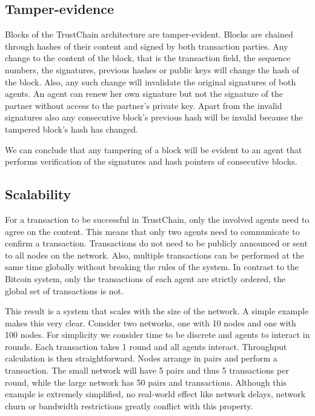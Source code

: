 \subsection{Tamper-evidence}
\label{sec:tamper-proof}
Blocks of the TrustChain architecture are tamper-evident. Blocks are chained through hashes of their
content and signed by both transaction parties. Any change to the content of the block, that is the
transaction field, the sequence numbers, the signatures, previous hashes or public keys will change
the hash of the block. Also, any such change will invalidate the original signatures of both agents. An agent
can renew her own signature but not the signature of the partner without access to the 
partner's private key. Apart from the invalid signatures also any consecutive block's previous hash
will be invalid because the tampered block's hash has changed.

We can conclude that any tampering of a block will be evident to an agent that performs verification
of the signatures and hash pointers of consecutive blocks.

\subsection{Scalability}
\label{sec:trustchain_scalability}
For a transaction to be successful in TrustChain, only the involved agents need to agree on the content. This
means that only two agents need to communicate to confirm a transaction. Transactions do not need to 
be publicly announced or sent to all nodes on
the network. Also, multiple transactions can be performed at the same time globally without breaking
the rules of the system. In contrast to the Bitcoin system, only the transactions of each agent are
strictly ordered, the global set of transactions is not.

This result is a system that scales with the size of the network. A simple example makes this very 
clear. Consider two networks, one with 10 nodes and one with 100 nodes. For simplicity we consider
time to be discrete and agents to interact in rounds. Each transaction takes 1 round and all agents 
interact. Throughput calculation is then straightforward. Nodes arrange in pairs and perform a
transaction. The small network will have 5 pairs and thus 5 transactions per round, while the large
network has 50 pairs and transactions. Although this example is extremely simplified, no real-world
effect like network delays, network churn or bandwidth restrictions greatly conflict with this property.

